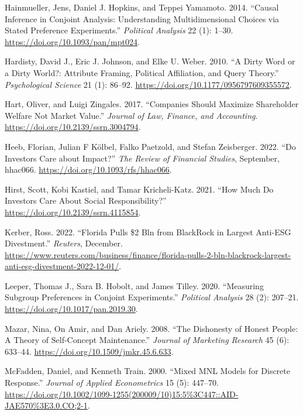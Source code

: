 \documentclass[
  12pt,
]{article}
\newlength{\cslhangindent}
\newlength{\cslentryspacingunit} %
\newenvironment{CSLReferences}[2] %
 {%
  \setlength{\parindent}{0pt}
  \ifodd #1
  \let\oldpar\par
  \def\par{\hangindent=\cslhangindent\oldpar}
  \fi
  \setlength{\parskip}{#2\cslentryspacingunit}
 }%
 {}
\begin{document}
\begin{CSLReferences}{1}{0}
\leavevmode{}%
Hainmueller, Jens, Daniel J. Hopkins, and Teppei Yamamoto. 2014. {``Causal Inference in Conjoint Analysis: Understanding Multidimensional Choices via Stated Preference Experiments.''} \emph{Political Analysis} 22 (1): 1--30. \url{https://doi.org/10.1093/pan/mpt024}.

\leavevmode{}%
Hardisty, David J., Eric J. Johnson, and Elke U. Weber. 2010. {``A Dirty Word or a Dirty World?: Attribute Framing, Political Affiliation, and Query Theory.''} \emph{Psychological Science} 21 (1): 86--92. \url{https://doi.org/10.1177/0956797609355572}.

\leavevmode{}%
Hart, Oliver, and Luigi Zingales. 2017. {``Companies Should Maximize Shareholder Welfare Not Market Value.''} \emph{Journal of Law, Finance, and Accounting}. \url{https://doi.org/10.2139/ssrn.3004794}.

\leavevmode{}%
Heeb, Florian, Julian F Kölbel, Falko Paetzold, and Stefan Zeisberger. 2022. {``Do Investors Care about Impact?''} \emph{The Review of Financial Studies}, September, hhac066. \url{https://doi.org/10.1093/rfs/hhac066}.

\leavevmode{}%
Hirst, Scott, Kobi Kastiel, and Tamar Kricheli-Katz. 2021. {``How Much Do Investors Care About Social Responsibility?''} \url{https://doi.org/10.2139/ssrn.4115854}.

\leavevmode{}%
Kerber, Ross. 2022. {``Florida Pulls {\$}2 Bln from BlackRock in Largest Anti-ESG Divestment.''} \emph{Reuters}, December. \url{https://www.reuters.com/business/finance/florida-pulls-2-bln-blackrock-largest-anti-esg-divestment-2022-12-01/}.

\leavevmode{}%
Leeper, Thomas J., Sara B. Hobolt, and James Tilley. 2020. {``Measuring Subgroup Preferences in Conjoint Experiments.''} \emph{Political Analysis} 28 (2): 207--21. \url{https://doi.org/10.1017/pan.2019.30}.

\leavevmode{}%
Mazar, Nina, On Amir, and Dan Ariely. 2008. {``The Dishonesty of Honest People: A Theory of Self-Concept Maintenance.''} \emph{Journal of Marketing Research} 45 (6): 633--44. \url{https://doi.org/10.1509/jmkr.45.6.633}.

\leavevmode{}%
McFadden, Daniel, and Kenneth Train. 2000. {``Mixed MNL Models for Discrete Response.''} \emph{Journal of Applied Econometrics} 15 (5): 447--70. \url{https://doi.org/10.1002/1099-1255(200009/10)15:5\%3C447::AID-JAE570\%3E3.0.CO;2-1}.


\end{CSLReferences}
\end{document}
